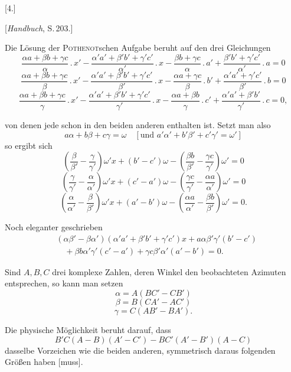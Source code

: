 
\begin{center}
[4.]

[\emph{Handbuch}, S.\,203.]
\end{center}

Die Lösung der \textsc{Pothenot}schen Aufgabe beruht auf den drei Gleichungen
\[
\frac{\alpha a+\beta b+\gamma c}{\alpha}\, . \, x' - \frac{\alpha' a'+\beta' b'+\gamma' c'}{\alpha'}\, . \, x - \frac{\beta b+\gamma c}{\alpha}\, . \, a' + \frac{\beta' b'+\gamma' c'}{\alpha'}\, . \, a = 0
\]
\[
\frac{\alpha a+\beta b+\gamma c}{\beta}\, . \, x' - \frac{\alpha' a'+\beta' b'+\gamma' c'}{\beta'}\, . \, x - \frac{\alpha a+\gamma c}{\beta}\, . \, b' + \frac{\alpha' a'+\gamma' c'}{\beta'}\, . \, b = 0
\]
\[
\frac{\alpha a+\beta b+\gamma c}{\gamma}\, . \, x' - \frac{\alpha' a'+\beta' b'+\gamma' c'}{\gamma'}\, . \, x - \frac{\alpha a+\beta b}{\gamma}\, . \, c' + \frac{\alpha' a'+\beta' b'}{\gamma'}\, . \, c = 0,
\]

von denen jede schon in den beiden anderen enthalten ist. Setzt man also
\[
a\alpha+b\beta+c\gamma=\omega \quad [\text{und } a'\alpha'+b'\beta'+c'\gamma'=\omega']
\]
so ergibt sich
\[
\left(\frac{\beta}{\beta'}-\frac{\gamma}{\gamma'}\right)\omega' x + (b'-c')\omega - \left(\frac{\beta b}{\beta'}-\frac{\gamma c}{\gamma'}\right)\omega' = 0
\]
\[
\left(\frac{\gamma}{\gamma'}-\frac{\alpha}{\alpha'}\right)\omega' x + (c'-a')\omega - \left(\frac{\gamma c}{\gamma'}-\frac{\alpha a}{\alpha'}\right)\omega' = 0
\]
\[
\left(\frac{\alpha}{\alpha'}-\frac{\beta}{\beta'}\right)\omega' x + (a'-b')\omega - \left(\frac{\alpha a}{\alpha'}-\frac{\beta b}{\beta'}\right)\omega' = 0.
\]

Noch eleganter geschrieben
\[
\begin{aligned}
&(\alpha\beta'-\beta\alpha')(\alpha' a'+\beta' b'+\gamma' c')x + a\alpha\beta'\gamma'(b'-c')\\
&\quad+ \beta b\alpha'\gamma'(c'-a') + \gamma c\beta'\alpha'(a'-b') = 0.
\end{aligned}
\]

\medskip

Sind $A, B, C$ drei komplexe Zahlen, deren Winkel den beobachteten Azimuten entsprechen, so kann man setzen
\[
\alpha = A(BC'-CB')
\]
\[
\beta = B(CA'-AC')
\]
\[
\gamma = C(AB'-BA').
\]

Die physische Möglichkeit beruht darauf, dass
\[
B'C(A-B)(A'-C') - BC'(A'-B')(A-C)
\]
dasselbe Vorzeichen wie die beiden anderen, symmetrisch daraus folgenden Größen haben [muss].
